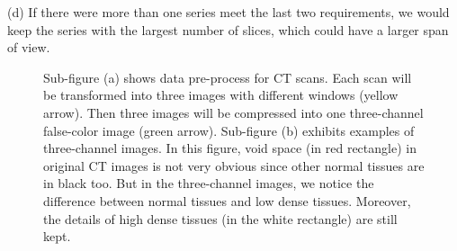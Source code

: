 \documentclass[journal]{IEEEtran}
\begin{document}
(d) If there were more than one series meet the last two requirements, we would keep the series with the largest number of slices, which could have a larger span of view.
\begin{figure}[htbp]
    \centering

    \centering
    \caption{Sub-figure (a) shows data pre-process for CT scans. Each scan will be transformed into three images with different windows (yellow arrow). Then three images will be compressed into one three-channel false-color image (green arrow).
    Sub-figure (b) exhibits examples of three-channel images. In this figure, void space (in red rectangle) in original CT images is not very obvious since other normal tissues are in black too. But in the three-channel images, we notice the difference between normal tissues and low dense tissues. Moreover, the details of high dense tissues (in the white rectangle) are still kept.
    }
    \label{3channel}
    \end{figure}
\end{document}
